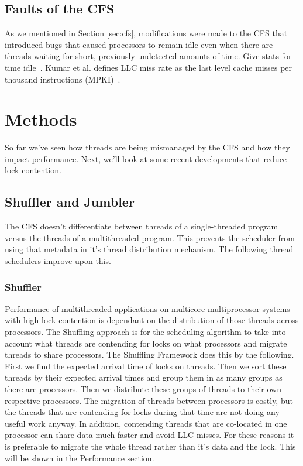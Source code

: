 \documentclass{sig-alternate}
\begin{document}
\subsection{Faults of the CFS}
\label{sec:cfsfaults}

As we mentioned in Section \ref{sec:cfs}, modifications were made to the CFS that introduced bugs that caused processors to remain idle even when there are threads waiting for short, previously undetected amounts of time. Give stats for time idle~\cite{Lozi:2016}. Kumar et al. defines LLC miss rate as the last level cache misses per thousand instructions (MPKI)~\cite{KumarEtal:2014}.


\section{Methods}
\label{sec:methods}

So far we've seen how threads are being mismanaged by the CFS and how they impact performance. Next, we'll look at some recent developments that reduce lock contention.

\subsection{Shuffler and Jumbler}
\label{sec:sj}

The CFS doesn't differentiate between threads of a single-threaded program versus the threads of a multithreaded program. This prevents the scheduler from using that metadata in it's thread distribution mechanism. The following thread schedulers improve upon this.

\subsubsection{Shuffler}
\label{sec:shuffler}

Performance of multithreaded applications on multicore multiprocessor systems with high lock contention is dependant on the distribution of those threads across processors. The Shuffling approach is for the scheduling algorithm to take into account what threads are contending for locks on what processors and migrate threads to share processors. The Shuffling Framework does this by the following. First we find the expected arrival time of locks on threads. Then we sort these threads by their expected arrival times and group them in as many groups as there are processors. Then we distribute these groups of threads to their own respective processors. The migration of threads between processors is costly, but the threads that are contending for locks during that time are not doing any useful work anyway. In addition, contending threads that are co-located in one processor can share data much faster and avoid LLC misses. For these reasons it is preferable to migrate the whole thread rather than it's data and the lock. This will be shown in the Performance section.~\cite{KumarEtal:2014}
\end{document}
